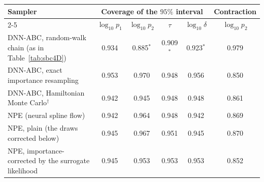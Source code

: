 \begin{tabular}{lccccc}
\toprule
Sampler & \multicolumn{4}{c}{Coverage of the $95\%$ interval} & Contraction \\
\cmidrule(lr){2-5}
 & $\log_{10}p_1$ & $\log_{10}p_2$ & $\tau$ & $\log_{10}\delta$ & $\log_{10}p_2$ \\
\midrule
DNN-ABC, random-walk chain (as in Table~\ref{tab:sbc4D}) & 0.934 & 0.885$^{\ast}$ & 0.909$^{\ast}$ & 0.923$^{\ast}$ & 0.979 \\
DNN-ABC, exact importance resampling & 0.953 & 0.970 & 0.948 & 0.956 & 0.850 \\
DNN-ABC, Hamiltonian Monte Carlo$^{\dagger}$ & 0.942 & 0.945 & 0.948 & 0.948 & 0.861 \\
\midrule
NPE (neural spline flow) & 0.942 & 0.964 & 0.948 & 0.942 & 0.869 \\
NPE, plain (the draws corrected below) & 0.945 & 0.967 & 0.951 & 0.945 & 0.870 \\
NPE, importance-corrected by the surrogate likelihood & 0.945 & 0.953 & 0.953 & 0.953 & 0.852 \\
\bottomrule
\end{tabular}
